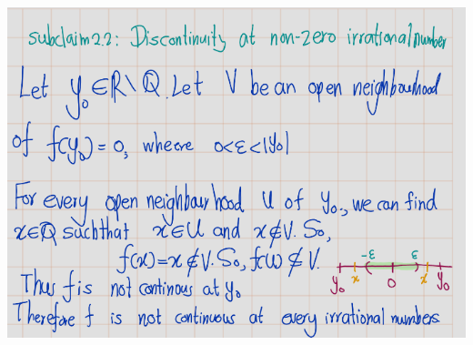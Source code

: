 \documentclass[
]{book}
\theoremstyle{definition}
\theoremstyle{definition}
\theoremstyle{definition}
\theoremstyle{definition}
\theoremstyle{remark}
\begin{document}
\includegraphics{figures/Exercises/Ex 2.18/ex-6-3.png}

  
\end{document}

